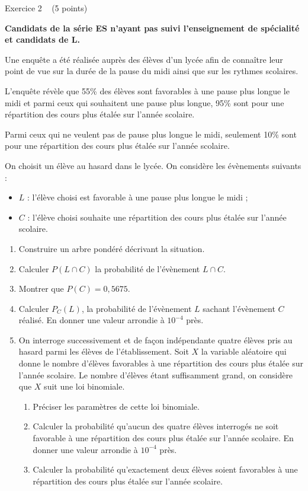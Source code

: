 
%
\begin{h2}Exercice 2   (5 points)\end{h2}
\par
\textbf{Candidats de la série ES n'ayant pas suivi l'enseignement de spécialité et candidats de L.}
\par
Une enquête a été réalisée auprès des élèves d'un lycée afin de connaître leur point de vue sur la durée de la pause du midi ainsi que sur les rythmes scolaires.
\par
L'enquête révèle que 55\% des élèves sont favorables à une pause plus longue le midi et parmi ceux qui souhaitent une pause plus longue, 95\% sont pour une répartition des cours plus étalée sur l'année scolaire.
\par
Parmi ceux qui ne veulent pas de pause plus longue le midi, seulement 10\% sont pour une répartition des cours plus étalée sur l'année scolaire.
\par
On choisit un élève au hasard dans le lycée. On considère les évènements suivants :
\begin{itemize}
     \item
     $L$ : l'élève choisi est favorable à une pause plus longue le midi ;
     \item
     $C$ : l'élève choisi souhaite une répartition des cours plus étalée sur l'année scolaire.
\end{itemize}
\begin{enumerate}
     \item
     Construire un arbre pondéré décrivant la situation.
     \item
     Calculer $P\left(L \cap C\right)$ la probabilité de l'évènement $L \cap C$.
     \item
     Montrer que $P\left(C\right)=0,5675$.
     \item
     Calculer $P_{C}\left(L\right)$, la probabilité de l'évènement $L$ sachant l'évènement $C$ réalisé. En donner une valeur arrondie à $10^{-4}$ près.
     \item
     On interroge successivement et de façon indépendante quatre élèves pris au hasard parmi les élèves de l'établissement. Soit $X$ la variable aléatoire qui donne le nombre d'élèves favorables à une répartition des cours plus étalée sur l'année scolaire. Le nombre d'élèves étant suffisamment grand, on considère que $X$ suit une loi binomiale.
     \begin{enumerate}[label=\alph*.]
          \item
          Préciser les paramètres de cette loi binomiale.
          \item
          Calculer la probabilité qu'aucun des quatre élèves interrogés ne soit favorable à une répartition des cours plus étalée sur l'année scolaire. En donner une valeur arrondie à $10^{-4}$ près.
          \item
          Calculer la probabilité qu'exactement deux élèves soient favorables à une répartition des cours plus étalée sur l'année scolaire.
     \end{enumerate}
\end{enumerate}
